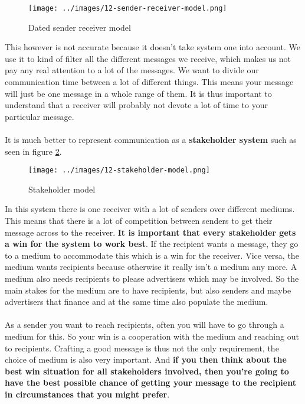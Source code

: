 \documentclass[../summary.tex]{subfiles}
\begin{document}
			\begin{figure}[h]
				\centering
				\texttt{[image: ../images/12-sender-receiver-model.png]}
				\caption{Dated sender receiver model}
				\label{fig:12-sender-receiver-model}
			\end{figure}
			This however is not accurate because it doesn't take system one into account. We use it to kind of filter all the different messages we receive, which makes us not pay any real attention to a lot of the messages. We want to divide our communication time between a lot of different things. This means your message will just be one message in a whole range of them. It is thus important to understand that a receiver will probably not devote a lot of time to your particular message. \\\\
			It is much better to represent communication as a \textbf{stakeholder system} such as seen in figure \ref{fig:12-stakeholder-model}.
			\\
			\begin{figure}[h]
				\centering
				\texttt{[image: ../images/12-stakeholder-model.png]}
				\caption{Stakeholder model}
				\label{fig:12-stakeholder-model}
			\end{figure}
			\newpage
			In this system there is one receiver with a lot of senders over different mediums. This means that there is a lot of competition between senders to get their message across to the receiver. \textbf{It is important that every stakeholder gets a win for the system to work best}. If the recipient wants a message, they go to a medium to accommodate this which is a win for the receiver. Vice versa, the medium wants recipients because otherwise it really isn't a medium any more. A medium also needs recipients to please advertisers which may be involved. So the main stakes for the medium are to have recipients, but also senders and maybe advertisers that finance and at the same time also populate the medium.
			\\\\
			As a sender you want to reach recipients, often you will have to go through a medium for this. So your win is a cooperation with the medium and reaching out to recipients. Crafting a good message is thus not the only requirement, the choice of medium is also very important. And \textbf{if you then think about the best win situation for all stakeholders involved, then you're going to have the best possible chance of getting your message to the recipient in circumstances that you might prefer}.
			
\end{document}
